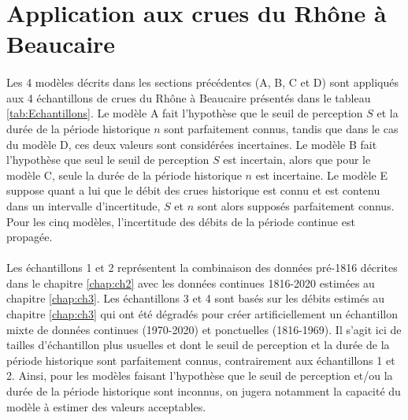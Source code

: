 	
\FloatBarrier		
\newpage
	
\section{Application aux crues du Rhône à Beaucaire}
\label{sec:applicationBcr}

	\paragraph{} Les 4 modèles décrits dans les sections précédentes (A, B, C et D) sont appliqués aux 4 échantillons de crues du Rhône à Beaucaire présentés dans le tableau \ref{tab:Echantillons}. Le modèle A fait l'hypothèse que le seuil de perception $S$ et la durée de la période historique $n$ sont parfaitement connus, tandis que dans le cas du modèle D, ces deux valeurs sont considérées incertaines. Le modèle B fait l'hypothèse que seul le seuil de perception $S$ est incertain, alors que pour le modèle C, seule la durée de la période historique $n$ est incertaine. Le modèle E suppose quant a lui que le débit des crues historique est connu et est contenu dans un intervalle d'incertitude, $S$ et $n$ sont alors supposés parfaitement connus. Pour les cinq modèles, l'incertitude des débits de la période continue est propagée. 
	
	\paragraph{} Les échantillons 1 et 2 représentent la combinaison des données pré-1816 décrites dans le chapitre \ref{chap:ch2} avec les données continues 1816-2020 estimées au chapitre \ref{chap:ch3}. Les échantillons 3 et 4 sont basés sur les débits estimés au chapitre \ref{chap:ch3} qui ont été dégradés pour créer artificiellement un échantillon mixte de données continues (1970-2020) et ponctuelles (1816-1969). Il s'agit ici de tailles d'échantillon plus usuelles et dont le seuil de perception et la durée de la période historique sont parfaitement connus, contrairement aux échantillons 1 et 2. Ainsi, pour les modèles faisant l'hypothèse que le seuil de perception et/ou la durée de la période historique sont inconnus, on jugera notamment la capacité du modèle à estimer des valeurs acceptables. 
	
